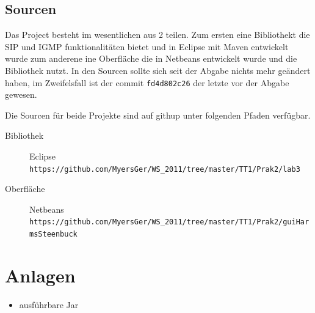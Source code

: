 \documentclass[10pt]{scrartcl}
\begin{document}
\subsection{Sourcen}
Das Project besteht im wesentlichen aus 2 teilen. Zum ersten eine Bibliothekt die SIP und IGMP funktionalitäten bietet und in Eclipse mit Maven entwickelt wurde zum anderene ine Oberfläche die in Netbeans entwickelt wurde und die Bibliothek nutzt. In den Sourcen sollte sich seit der Abgabe nichts mehr geändert haben, im Zweifelsfall ist der commit \verb!fd4d802c26! der letzte vor der Abgabe gewesen.

Die Sourcen für beide Projekte sind auf githup unter folgenden Pfaden verfügbar.
\begin{description}
	\item[Bibliothek] Eclipse \\ \verb!https://github.com/MyersGer/WS_2011/tree/master/TT1/Prak2/lab3!
	\item[Oberfläche] Netbeans \\ \verb!https://github.com/MyersGer/WS_2011/tree/master/TT1/Prak2/guiHarmsSteenbuck!
\end{description}

\section{Anlagen}
\begin{itemize}
	\item ausführbare Jar
\end{itemize}
\end{document}
